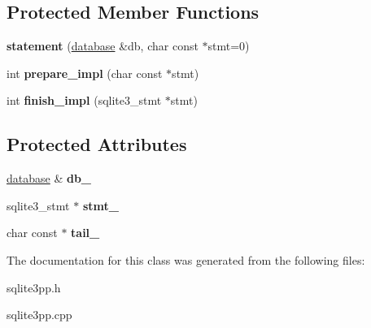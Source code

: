 \subsection*{Protected Member Functions}
\begin{DoxyCompactItemize}
\item 
\hypertarget{classsqlite3pp_1_1statement_a3f762e8ad30b0eee07202fbf3b96dd6e}{{\bfseries statement} (\hyperlink{classsqlite3pp_1_1database}{database} \&db, char const $\ast$stmt=0)}\label{classsqlite3pp_1_1statement_a3f762e8ad30b0eee07202fbf3b96dd6e}

\item 
\hypertarget{classsqlite3pp_1_1statement_a591d916bd0845327c7c4d9c9449f0ae2}{int {\bfseries prepare\-\_\-impl} (char const $\ast$stmt)}\label{classsqlite3pp_1_1statement_a591d916bd0845327c7c4d9c9449f0ae2}

\item 
\hypertarget{classsqlite3pp_1_1statement_a4fa7407507a5436f523b843663ccb86f}{int {\bfseries finish\-\_\-impl} (sqlite3\-\_\-stmt $\ast$stmt)}\label{classsqlite3pp_1_1statement_a4fa7407507a5436f523b843663ccb86f}

\end{DoxyCompactItemize}
\subsection*{Protected Attributes}
\begin{DoxyCompactItemize}
\item 
\hypertarget{classsqlite3pp_1_1statement_a5f37049058928eb181e8480757b2dbb7}{\hyperlink{classsqlite3pp_1_1database}{database} \& {\bfseries db\-\_\-}}\label{classsqlite3pp_1_1statement_a5f37049058928eb181e8480757b2dbb7}

\item 
\hypertarget{classsqlite3pp_1_1statement_a0bd419a1e5f45de676eb2c4a5e4d4f3d}{sqlite3\-\_\-stmt $\ast$ {\bfseries stmt\-\_\-}}\label{classsqlite3pp_1_1statement_a0bd419a1e5f45de676eb2c4a5e4d4f3d}

\item 
\hypertarget{classsqlite3pp_1_1statement_a1adff22d514901074aab555dce882881}{char const $\ast$ {\bfseries tail\-\_\-}}\label{classsqlite3pp_1_1statement_a1adff22d514901074aab555dce882881}

\end{DoxyCompactItemize}


The documentation for this class was generated from the following files\-:\begin{DoxyCompactItemize}
\item 
sqlite3pp.\-h\item 
sqlite3pp.\-cpp\end{DoxyCompactItemize}
